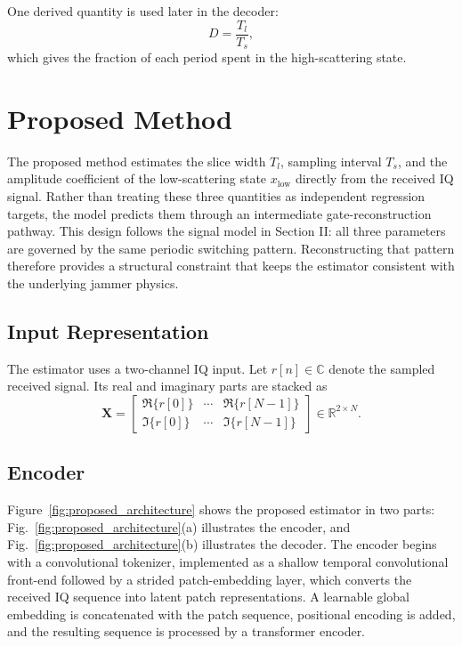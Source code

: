 \documentclass[conference]{IEEEtran}
\begin{document}
One derived quantity is used later in the decoder:
\begin{equation}
D=\frac{T_l}{T_s},
\end{equation}
which gives the fraction of each period spent in the high-scattering state.

\section{Proposed Method}
The proposed method estimates the slice width $T_l$, sampling interval $T_s$, and the amplitude coefficient of the low-scattering state $x_{\text{low}}$ directly from the received IQ signal. Rather than treating these three quantities as independent regression targets, the model predicts them through an intermediate gate-reconstruction pathway. This design follows the signal model in Section II: all three parameters are governed by the same periodic switching pattern. Reconstructing that pattern therefore provides a structural constraint that keeps the estimator consistent with the underlying jammer physics.

\subsection{Input Representation}
The estimator uses a two-channel IQ input. Let $r[n] \in \mathbb{C}$ denote the sampled received signal. Its real and imaginary parts are stacked as
\begin{equation}
\mathbf{X}=
\begin{bmatrix}
\Re\{r[0]\} & \cdots & \Re\{r[N-1]\}\\
\Im\{r[0]\} & \cdots & \Im\{r[N-1]\}
\end{bmatrix}
\in \mathbb{R}^{2 \times N}.
\end{equation}

\subsection{Encoder}
Figure~\ref{fig:proposed_architecture} shows the proposed estimator in two parts: Fig.~\ref{fig:proposed_architecture}(a) illustrates the encoder, and Fig.~\ref{fig:proposed_architecture}(b) illustrates the decoder. The encoder begins with a convolutional tokenizer, implemented as a shallow temporal convolutional front-end followed by a strided patch-embedding layer, which converts the received IQ sequence into latent patch representations. A learnable global embedding is concatenated with the patch sequence, positional encoding is added, and the resulting sequence is processed by a transformer encoder.
\end{document}
